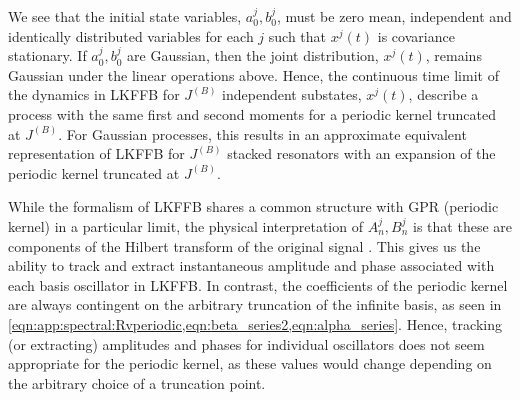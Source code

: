 We see that the initial state variables, $a^j_0, b^j_0$, must be zero mean, independent and identically distributed variables for each $j$ such that $x^j(t)$ is covariance stationary. If $a^j_0, b^j_0$ are Gaussian, then the joint distribution, $x^j(t)$, remains Gaussian under the linear operations above. Hence, the continuous time limit of the dynamics in LKFFB for $J^{(B)}$  independent substates, $x^j(t)$, describe a process with the same first and second moments for a periodic kernel truncated at $J^{(B)}$. For Gaussian processes, this results in an approximate equivalent representation of LKFFB for $J^{(B)}$ stacked resonators with an expansion of the periodic kernel truncated at $J^{(B)}$.

While the formalism of LKFFB shares a common structure with GPR (periodic kernel) in a particular limit, the  physical interpretation of $A^j_{n}, B^j_{n}$ is that these are components of the Hilbert transform of the original signal \cite{livska2007}. This gives us the ability to track and extract instantaneous amplitude and phase associated with each basis oscillator in LKFFB. In contrast, the coefficients of the periodic kernel are always contingent on the arbitrary truncation of the infinite basis, as seen in \cref{eqn:app:spectral:Rvperiodic,eqn:beta_series2,eqn:alpha_series}. Hence, tracking (or extracting) amplitudes and phases for individual oscillators  does not seem appropriate for the periodic kernel, as these values would change depending on the arbitrary choice of a truncation point.  


\clearpage